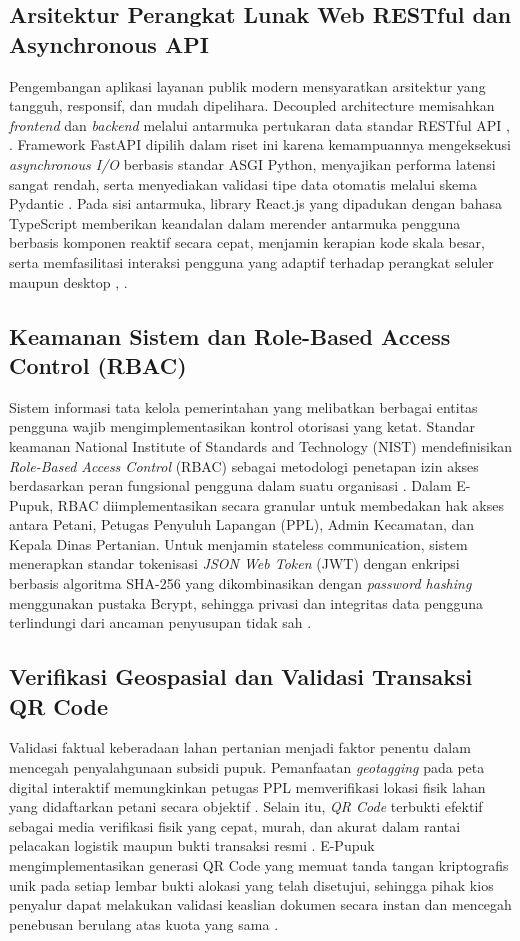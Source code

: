 ﻿\documentclass[conference]{IEEEtran}
\begin{document}
\subsection{Arsitektur Perangkat Lunak Web RESTful dan Asynchronous API}
Pengembangan aplikasi layanan publik modern mensyaratkan arsitektur yang tangguh, responsif, dan mudah dipelihara. Decoupled architecture memisahkan \textit{frontend} dan \textit{backend} melalui antarmuka pertukaran data standar RESTful API \cite{b8}, \cite{b9}. Framework FastAPI dipilih dalam riset ini karena kemampuannya mengeksekusi \textit{asynchronous I/O} berbasis standar ASGI Python, menyajikan performa latensi sangat rendah, serta menyediakan validasi tipe data otomatis melalui skema Pydantic \cite{b8}. Pada sisi antarmuka, library React.js yang dipadukan dengan bahasa TypeScript memberikan keandalan dalam merender antarmuka pengguna berbasis komponen reaktif secara cepat, menjamin kerapian kode skala besar, serta memfasilitasi interaksi pengguna yang adaptif terhadap perangkat seluler maupun desktop \cite{b9}, \cite{b15}.

\subsection{Keamanan Sistem dan Role-Based Access Control (RBAC)}
Sistem informasi tata kelola pemerintahan yang melibatkan berbagai entitas pengguna wajib mengimplementasikan kontrol otorisasi yang ketat. Standar keamanan National Institute of Standards and Technology (NIST) mendefinisikan \textit{Role-Based Access Control} (RBAC) sebagai metodologi penetapan izin akses berdasarkan peran fungsional pengguna dalam suatu organisasi \cite{b10}. Dalam E-Pupuk, RBAC diimplementasikan secara granular untuk membedakan hak akses antara Petani, Petugas Penyuluh Lapangan (PPL), Admin Kecamatan, dan Kepala Dinas Pertanian. Untuk menjamin stateless communication, sistem menerapkan standar tokenisasi \textit{JSON Web Token} (JWT) dengan enkripsi berbasis algoritma SHA-256 yang dikombinasikan dengan \textit{password hashing} menggunakan pustaka Bcrypt, sehingga privasi dan integritas data pengguna terlindungi dari ancaman penyusupan tidak sah \cite{b11}.

\subsection{Verifikasi Geospasial dan Validasi Transaksi QR Code}
Validasi faktual keberadaan lahan pertanian menjadi faktor penentu dalam mencegah penyalahgunaan subsidi pupuk. Pemanfaatan \textit{geotagging} pada peta digital interaktif memungkinkan petugas PPL memverifikasi lokasi fisik lahan yang didaftarkan petani secara objektif \cite{b7}. Selain itu, \textit{QR Code} terbukti efektif sebagai media verifikasi fisik yang cepat, murah, dan akurat dalam rantai pelacakan logistik maupun bukti transaksi resmi \cite{b12}. E-Pupuk mengimplementasikan generasi QR Code yang memuat tanda tangan kriptografis unik pada setiap lembar bukti alokasi yang telah disetujui, sehingga pihak kios penyalur dapat melakukan validasi keaslian dokumen secara instan dan mencegah penebusan berulang atas kuota yang sama \cite{b12}.
\end{document}
